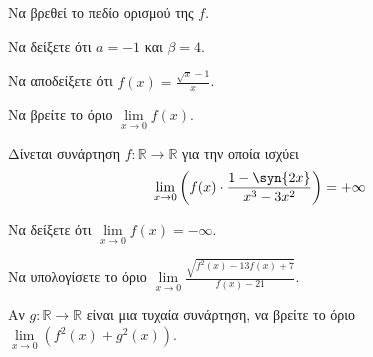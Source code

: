 \documentclass[ektypwsh]{frontisthrio-diag}
\begin{document}
\begin{thema}
\begin{erwthma}
\item Να βρεθεί το πεδίο ορισμού της $ f $.
\item Να δείξετε ότι $ a=-1 $ και $ \beta=4 $.
\item Να αποδείξετε ότι $ f(x)=\frac{\sqrt{x}-1}{x} $.
\item Να βρείτε το όριο $ \lim\limits_{x\to 0}{f(x)} $.
\end{erwthma}
\item Δίνεται συνάρτηση $ f:\mathbb{R}\to \mathbb{R} $ για την οποία ισχύει
\[ \lim_{x\to 0}{\left( f(x)\cdot\frac{1-\syn{2x}}{x^3-3x^2}\right)} =+\infty \]
\begin{erwthma}
\item Να δείξετε ότι $ \lim\limits_{x\to 0}{f(x)}=-\infty $.
\item Να υπολογίσετε το όριο $ \lim\limits_{x\to 0}{\frac{\sqrt{f^2(x)-13f(x)+7}}{f(x)-21}} $.
\item Αν $ g:\mathbb{R}\to\mathbb{R} $ είναι μια τυχαία συνάρτηση, να βρείτε το όριο $ \lim\limits_{x\to 0}{\left(f^2(x)+g^2(x)\right)} $.
\end{erwthma}
\end{thema}
\kaliepityxia
{}
\end{document}
